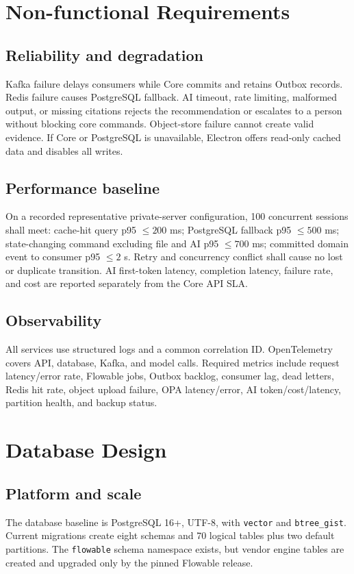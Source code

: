 \documentclass[journal,a4paper,onecolumn]{IEEEtran}
\begin{document}
\section{Non-functional Requirements}
\subsection{Reliability and degradation}
Kafka failure delays consumers while Core commits and retains Outbox records. Redis failure causes PostgreSQL fallback. AI timeout, rate limiting, malformed output, or missing citations rejects the recommendation or escalates to a person without blocking core commands. Object-store failure cannot create valid evidence. If Core or PostgreSQL is unavailable, Electron offers read-only cached data and disables all writes.

\subsection{Performance baseline}
On a recorded representative private-server configuration, 100 concurrent sessions shall meet: cache-hit query p95 $\leq 200$ ms; PostgreSQL fallback p95 $\leq 500$ ms; state-changing command excluding file and AI p95 $\leq 700$ ms; committed domain event to consumer p95 $\leq 2$ s. Retry and concurrency conflict shall cause no lost or duplicate transition. AI first-token latency, completion latency, failure rate, and cost are reported separately from the Core API SLA.

\subsection{Observability}
All services use structured logs and a common correlation ID. OpenTelemetry covers API, database, Kafka, and model calls. Required metrics include request latency/error rate, Flowable jobs, Outbox backlog, consumer lag, dead letters, Redis hit rate, object upload failure, OPA latency/error, AI token/cost/latency, partition health, and backup status.

\section{Database Design}
\subsection{Platform and scale}
The database baseline is PostgreSQL 16+, UTF-8, with \texttt{vector} and \texttt{btree\_gist}. Current migrations create eight schemas and 70 logical tables plus two default partitions. The \texttt{flowable} schema namespace exists, but vendor engine tables are created and upgraded only by the pinned Flowable release.
\end{document}
